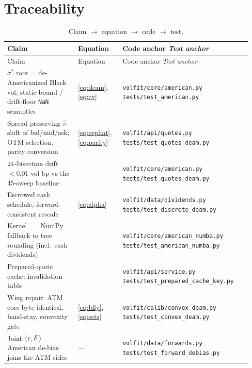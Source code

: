 \documentclass[11pt]{article}
\begin{document}
\section{Traceability}
\label{app:trace}

\begingroup
\small
\setlength{\tabcolsep}{4pt}
\renewcommand{\arraystretch}{1.15}
\begin{longtable}{@{}p{}p{}p{}@{}}
\caption{Claim $\to$ equation $\to$ code $\to$ test.}\label{tab:trace}\\
\toprule Claim & Equation & Code anchor \newline \emph{Test anchor}\\ \midrule
\endfirsthead
\toprule Claim & Equation & Code anchor \newline \emph{Test anchor}\\ \midrule
\endhead
$\sigma^*$ root = de-Americanized Black vol; static-bound / drift-floor
\texttt{NaN} semantics & \eqref{eq:deam}, \eqref{eq:cv} &
\nolinkurl{volfit/core/american.py}\newline
\nolinkurl{tests/test_american.py}\\
\addlinespace
Spread-preserving $\hat\pi$ shift of bid/mid/ask; OTM selection; parity
conversion & \eqref{eq:eephat}, \eqref{eq:parity} &
\nolinkurl{volfit/api/quotes.py}\newline
\nolinkurl{tests/test_quotes_deam.py}\\
\addlinespace
$24$-bisection drift $<0.01$ vol bp vs the 45-sweep baseline &
--- & \nolinkurl{volfit/core/american.py}\newline
\nolinkurl{tests/test_quotes_deam.py}\\
\addlinespace
Escrowed cash schedule, forward-consistent rescale & \eqref{eq:alpha} &
\nolinkurl{volfit/data/dividends.py}\newline
\nolinkurl{tests/test_discrete_deam.py}\\
\addlinespace
Kernel $=$ NumPy fallback to tree rounding (incl.\ cash dividends) & ---
& \nolinkurl{volfit/core/american_numba.py}\newline
\nolinkurl{tests/test_american_numba.py}\\
\addlinespace
Prepared-quote cache: invalidation table & --- &
\nolinkurl{volfit/api/service.py}\newline
\nolinkurl{tests/test_prepared_cache_key.py}\\
\addlinespace
Wing repair: ATM core byte-identical, band-stay, convexity gate &
\eqref{eq:bfly}, \eqref{eq:sets} &
\nolinkurl{volfit/calib/convex_deam.py}\newline
\nolinkurl{tests/test_convex_deam.py}\\
\addlinespace
Joint $(r,F)$ American de-bias joins the ATM sides & --- &
\nolinkurl{volfit/data/forwards.py}\newline
\nolinkurl{tests/test_forward_debias.py}\\
\bottomrule
\end{longtable}
\endgroup
\end{document}
